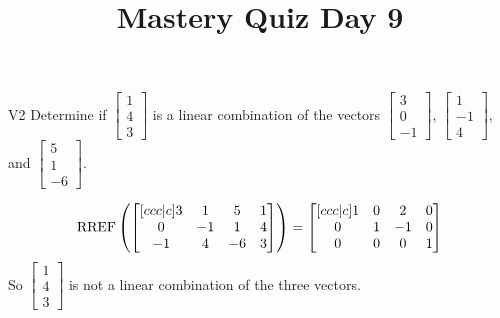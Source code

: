 \documentclass{sbgLAquiz}
\title{Mastery Quiz Day 9 }
\begin{document}
\begin{problem}{V2} Determine if $\begin{bmatrix} 1 \\ 4 \\ 3 \end{bmatrix}$ is a linear combination of the vectors $\begin{bmatrix} 3 \\ 0 \\ -1 \end{bmatrix}$, $\begin{bmatrix} 1 \\ -1 \\ 4 \end{bmatrix}$, and $\begin{bmatrix} 5 \\ 1 \\  -6 \end{bmatrix}$.
\end{problem}
\begin{solution}
$$\operatorname{RREF}\left(\begin{bmatrix}[ccc|c] 3 & 1 & 5 & 1 \\ 0 & -1 & 1 & 4 \\ -1 & 4 & -6 & 3 \end{bmatrix} \right) = \begin{bmatrix}[ccc|c] 1 & 0 & 2 & 0 \\ 0 & 1 & -1 & 0 \\ 0 & 0 & 0 & 1 \end{bmatrix}$$
So $\begin{bmatrix} 1 \\ 4 \\ 3 \end{bmatrix}$ is not a linear combination of the three vectors.
\end{solution}
\end{document}
